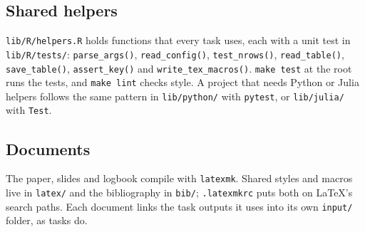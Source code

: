 \subsection{Shared helpers}
\texttt{lib/R/helpers.R} holds functions that every task uses, each with a unit test in \texttt{lib/R/tests/}:
\texttt{parse\_args()}, \texttt{read\_config()}, \texttt{test\_nrows()}, \texttt{read\_table()}, \texttt{save\_table()}, \texttt{assert\_key()} and \texttt{write\_tex\_macros()}.
\texttt{make test} at the root runs the tests, and \texttt{make lint} checks style.
A project that needs Python or Julia helpers follows the same pattern in \texttt{lib/python/} with \texttt{pytest}, or \texttt{lib/julia/} with \texttt{Test}.

\subsection{Documents}
The paper, slides and logbook compile with \texttt{latexmk}.
Shared styles and macros live in \texttt{latex/} and the bibliography in \texttt{bib/}; \texttt{.latexmkrc} puts both on LaTeX's search paths.
Each document links the task outputs it uses into its own \texttt{input/} folder, as tasks do.
